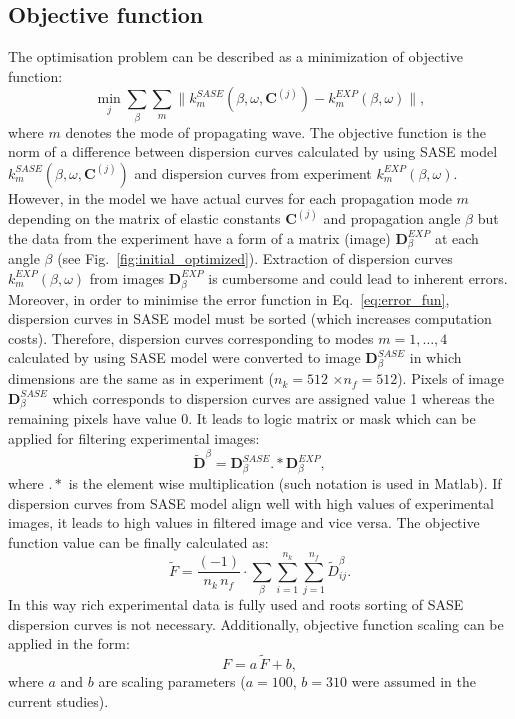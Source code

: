 \documentclass[preprint,12pt]{elsarticle}
\newcommand{\matr}[1]{\mathbf{#1}} %
\begin{document}
	\subsection{Objective function}
	The optimisation problem can be described as a minimization of objective function:
	\begin{equation}
	\min_j \sum_{\beta}\sum_{m} \| k^{SASE}_{m}(\beta, \omega,\matr{C}^{(j)}) -k^{EXP}_{m}(\beta,\omega) \|,
	\label{eq:error_fun}
	\end{equation}
	where $m$ denotes the mode of propagating wave.
	The objective function is the norm of a difference between dispersion curves calculated by using SASE model $k^{SASE}_{m}(\beta, \omega,\matr{C}^{(j)})$ and dispersion curves from experiment $k^{EXP}_{m}(\beta,\omega)$. However, in the model we have actual curves for each propagation mode $m$ depending on the matrix of elastic constants $\matr{C}^{(j)}$ and propagation angle $\beta$ but the data from the experiment have a form of a matrix (image) $\matr{D}^{EXP}_{\beta}$ at each angle $\beta$ (see Fig.~\ref{fig:initial_optimized}). Extraction of dispersion curves $k^{EXP}_{m}(\beta,\omega)$ from images $\matr{D}^{EXP}_{\beta}$ is cumbersome and could lead to inherent errors. Moreover, in order to minimise the error function in Eq.~\ref{eq:error_fun}, dispersion curves in SASE model must be sorted (which increases computation costs). Therefore, dispersion curves corresponding to modes $m=1,\ldots, 4$ calculated by using SASE model were converted to image $\matr{D}^{SASE}_{\beta} $ in which dimensions are the same as in experiment ($n_k=512$ $\times$$n_f= 512$). Pixels of image $\matr{D}^{SASE}_{\beta} $ which corresponds to dispersion curves are assigned value 1 whereas the remaining pixels have value 0. It leads to logic matrix or mask which can be applied for filtering experimental images: 
	\begin{equation}
		\tilde{\matr{D}}^{\beta} =  \matr{D}^{SASE}_{\beta}  .*    \matr{D}^{EXP}_{\beta} ,
		\label{eq:objective_fun}
   \end{equation}	
    where $.*$ is the element wise multiplication (such notation is used in Matlab). If dispersion curves from SASE model align well with high values of experimental images, it leads to high values in filtered image and vice versa.
	The objective function value can be finally calculated as: 
	\begin{equation}
	\tilde{F} = \frac{(-1)}{n_k \, n_f}  \cdot \sum_{\beta}  \sum_{i=1}^{n_k} \sum_{j=1}^{n_f}	\tilde{D}_{ij}^{\beta}. 
	\end{equation}
	In this way rich experimental data is fully used and roots sorting of SASE dispersion curves is not necessary. Additionally, objective function scaling can be applied in the form:
	\begin{equation}
	F = a \,  \tilde{F} + b,
	\end{equation}
	where $a$ and $b$ are scaling parameters ($a=100$, $b=310$ were assumed in the current studies).
\end{document}
